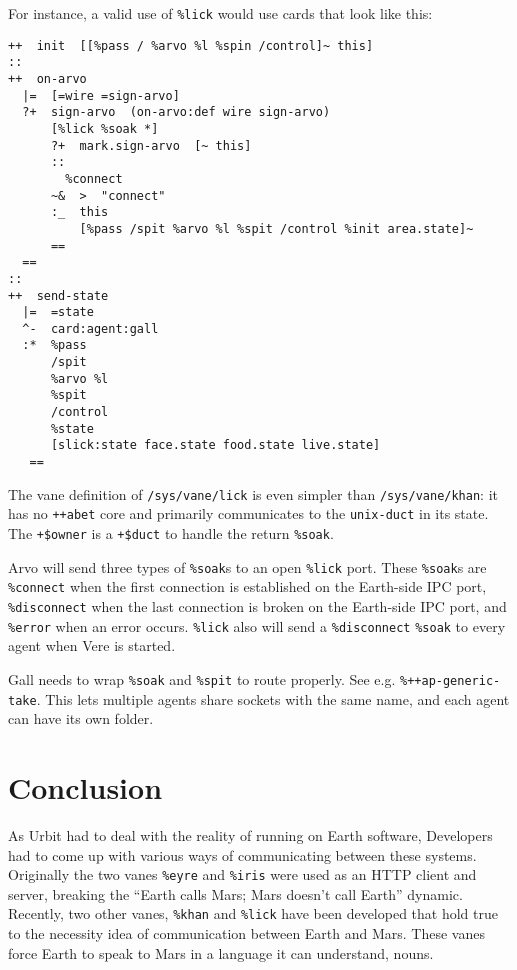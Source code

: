 \documentclass[twoside]{article}
\begin{document}
For instance, a valid use of \texttt{\%lick} would use cards that look like this:

\begin{verbatim}
++  init  [[%pass / %arvo %l %spin /control]~ this]
::
++  on-arvo
  |=  [=wire =sign-arvo]
  ?+  sign-arvo  (on-arvo:def wire sign-arvo)
      [%lick %soak *]
      ?+  mark.sign-arvo  [~ this]
      ::
        %connect
      ~&  >  "connect"
      :_  this  
          [%pass /spit %arvo %l %spit /control %init area.state]~
      ==  
  ==
::
++  send-state
  |=  =state
  ^-  card:agent:gall
  :*  %pass 
      /spit 
      %arvo %l 
      %spit 
      /control 
      %state 
      [slick:state face.state food.state live.state]
   ==
\end{verbatim}

The vane definition of \texttt{/sys/vane/lick} is even simpler than \texttt{/sys/vane/khan}:  it has no \texttt{++abet} core and primarily communicates to the \texttt{unix-duct} in its state.  The \texttt{+\$owner} is a \texttt{+\$duct} to handle the return \texttt{\%soak}.

Arvo will send three types of \texttt{\%soak}s to an open \texttt{\%lick} port. These \texttt{\%soak}s are \texttt{\%connect} when the first connection is established on the Earth-side IPC port, \texttt{\%disconnect} when the last connection is broken on the Earth-side IPC port, and \texttt{\%error} when an error occurs. \texttt{\%lick} also will send a \texttt{\%disconnect} \texttt{\%soak} to every agent when Vere is started.

Gall needs to wrap \texttt{\%soak} and \texttt{\%spit} to route properly.  See e.g. \texttt{\%++ap-generic-take}.  This lets multiple agents share sockets with the same name, and each agent can have its own folder.

\section{Conclusion}

As Urbit had to deal with the reality of running on Earth software, Developers had to come up with various ways of communicating between these systems. Originally the two vanes \texttt{\%eyre} and \texttt{\%iris} were used as an HTTP client and server, breaking the ``Earth calls Mars; Mars doesn't call Earth'' dynamic. 
Recently, two other vanes, \texttt{\%khan} and \texttt{\%lick} have been developed that hold true to the necessity idea of communication between Earth and Mars. These vanes force Earth to speak to Mars in a language it can understand, nouns.



\printbibliography
\end{document}
